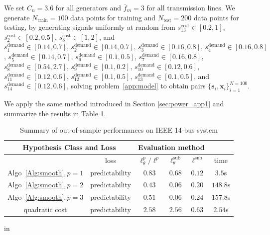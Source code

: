 \documentclass{article}
\def\x{\bm{x}}
\def\s{\bm{s}}
\theoremstyle{plain}
\begin{document}
 We set $C_n = 3.6$ for all generators and $\bar{f}_m = 3$ for all transmission lines.  We generate $N_{\text{train}} = 100$ data points for training and $N_{\text{test}} = 200$ data points for testing, by generating signals uniformly at random from $s^{\text{cost}}_{13}\in[0.2, 1]$, $s^{\text{cost}}_2\in [0.2, 0.5]$,  $s^{\text{cost}}_8\in[1, 2]$, and $s^{\text{demand}}_1\in[0.14, 0.7],\,s^{\text{demand}}_2\in[0.14,0.7],\,s^{\text{demand}}_3\in[0.16, 0.8],\,s^{\text{demand}}_4\in [0.16, 0.8]$, $s^{\text{demand}}_5\in [0.14, 0.7]$, $s^{\text{demand}}_6\in [0.1, 0.5]$, $s^{\text{demand}}_7\in [0.16, 0.8]$, $s^{\text{demand}}_8\in [0.54, 2.7]$, $s^{\text{demand}}_9\in [0.1, 0.2]$, $s^{\text{demand}}_{10}\in [0.12, 0.6]$, $s^{\text{demand}}_{11}\in [0.12, 0.6]$, $s^{\text{demand}}_{12}\in [0.1, 0.5]$, $s^{\text{demand}}_{13}\in [0.1, 0.5]$, and $s^{\text{demand}}_{14}\in [0.12, 0.6]$, solving problem~\eqref{app:model} to obtain pairs $\{\s_i,\x_i\}_{i = 1}^{N=100}$. 

We apply the same method introduced in Section \ref{sec:power_app1} and summarize the results in Table \ref{tab:ieee14}.
\begin{table}[h!]
\caption{Summary of out-of-sample performances on IEEE 14-bus system}\label{tab:ieee14}
\begin{center}
\small{
\begin{tabular}{|c|c|c|c|c|c|}
\multicolumn{2}{c}{Hypothesis Class and Loss}& \multicolumn{3}{c}{Evaluation method}\\
    \hline
    & loss & $\ell_\theta^p /\ell^p$ &  $\ell_\theta^\text{sub}$ &  $\ell^\text{sub}$ & time \\
    \hline
    \multirow{1}{*}{Algo~\ref{Alg:smooth},\,$p=1$}&  predictability  &  $0.83$ & $0.68$ & $0.12$ & $3.5$s\\

    \hline
    \multirow{1}{*}{Algo~\ref{Alg:smooth},\,$p=2$}& predictability &  $0.43$ & $0.06$ & $0.20$ & $148.8$s \\

    \hline
    \multirow{1}{*}{Algo~\ref{Alg:smooth},\,$p=3$}& predictability &  $0.51$ & $0.06$ & $0.24$ & $157.8$s \\
    
        \hline
    \multirow{1}{*}{quadratic cost}& predictability &  $2.58$  & $2.56$ & $0.63$ & $2.54$s \\
    \hline
\end{tabular}}
\end{center}
 in
\end{table}
\end{document}
